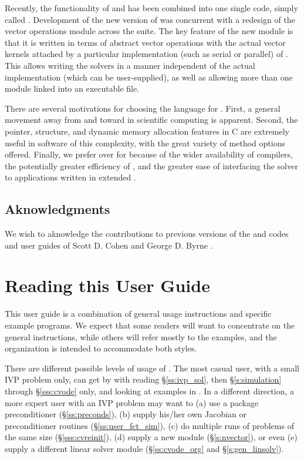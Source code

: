 Recently, the functionality of {\cvode} and {\pvode} has been combined into
one single code, simply called {\cvode}.
Development of the new version of {\cvode} was concurrent with a redesign of the vector operations module
across the {\sundials} suite. The key feature of the new {\nvector} module is that it
is written in terms of abstract vector operations with the actual vector kernels attached
by a particular implementation (such as serial or parallel) of {\nvector}. This allows
writing the {\sundials} solvers in a manner independent of the actual {\nvector} 
implementation (which can be user-supplied), as well as allowing more than one 
{\nvector} module linked into an executable file.

There are several motivations for choosing the {\C} language for {\cvode}.
First, a general movement away from {\F} and toward {\C} in scientific
computing is apparent.  Second, the pointer, structure, and dynamic
memory allocation features in C are extremely useful in software of
this complexity, with the great variety of method options offered.
Finally, we prefer {\C} over {\CPP} for {\cvode} because of the wider
availability of {\C} compilers, the potentially greater efficiency of {\C},
and the greater ease of interfacing the solver to applications written
in extended {\F}.

\subsection{Aknowledgments}
We wish to aknowledge the contributions to previous versions of the
{\cvode} and {\pvode} codes and user guides of Scott D. Cohen \cite{CoHi:94}
and George D. Byrne \cite{ByHi:98}.

\section{Reading this User Guide}\label{ss:reading}

This user guide is a combination of general usage instructions and
specific example programs.  We expect that some readers will want to
concentrate on the general instructions, while others will refer
mostly to the examples, and the organization is intended to
accommodate both styles.

There are different possible levels of usage of {\cvode}. The most casual
user, with a small IVP problem only, can get by with reading \S\ref{ss:ivp_sol}, 
then \S\ref{s:simulation} through \S\ref{sss:cvode} only, and looking at examples 
in \cite{cvode2.1_ex}. 
In a different direction, a more expert user with an IVP problem may want
to (a) use a package preconditioner (\S\ref{ss:preconds}), (b) supply
his/her own Jacobian or preconditioner routines (\S\ref{ss:user_fct_sim}),
(c) do multiple runs of problems of the same size (\S\ref{sss:cvreinit}), 
(d) supply a new {\nvector} module (\S\ref{s:nvector}), or even 
(e) supply a different linear solver module
(\S\ref{ss:cvode_org} and \S\ref{s:gen_linsolv}).

